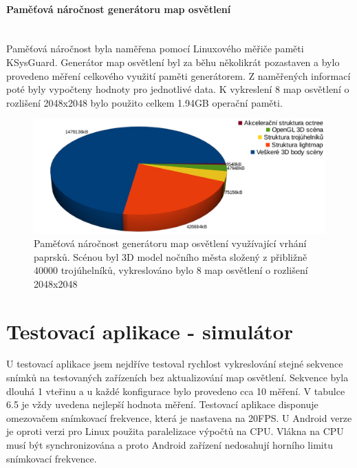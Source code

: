 \documentclass[11pt,twoside,a4paper]{book}
\begin{document}
\paragraph{Paměťová náročnost generátoru map osvětlení}\ \ \\

Paměťová náročnost byla naměřena pomocí Linuxového měřiče paměti KSysGuard. Generátor map osvětlení byl za běhu několikrát pozastaven a bylo provedeno měření celkového využití paměti generátorem. Z naměřených informací poté byly vypočteny hodnoty pro jednotlivé data. K vykreslení 8 map osvětlení o rozlišení 2048x2048 bylo použito celkem 1.94GB operační paměti.
\begin{figure}[h!]
\includegraphics[width=150mm]{figures/lmgen-mem-usage.png}
\caption{Paměťová náročnost generátoru map osvětlení využívající vrhání paprsků. Scénou byl 3D model nočního města složený z přibližně 40000 trojúhelníků, vykreslováno bylo 8 map osvětlení o rozlišení 2048x2048 }
\end{figure}

\section{Testovací aplikace - simulátor}

U testovací aplikace jsem nejdříve testoval rychlost vykreslování stejné sekvence snímků na testovaných zařízeních bez aktualizování map osvětlení. Sekvence byla dlouhá 1 vteřinu a u každé konfigurace bylo provedeno cca 10 měření. V tabulce 6.5 je vždy uvedena nejlepší hodnota měření. Testovací aplikace disponuje omezovačem snímkovací frekvence, která je nastavena na 20FPS. U Android verze je oproti verzi pro Linux použita paralelizace výpočtů na CPU. Vlákna na CPU musí být synchronizována a proto Android zařízení nedosahují horního limitu snímkovací frekvence.
\newpage
\end{document}
